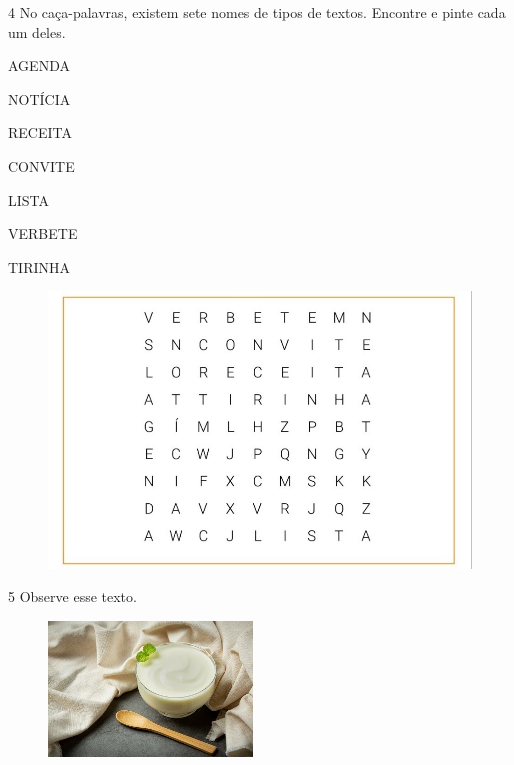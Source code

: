 \pagebreak
\num{4} No caça-palavras, existem sete nomes de tipos de textos. 
Encontre e pinte cada um deles.  

\begin{myquote}
\begin{multicols}{2}
AGENDA

NOTÍCIA

RECEITA

CONVITE

LISTA

VERBETE

TIRINHA
\end{multicols}
\end{myquote}


\begin{figure}[htpb!]
\includegraphics[width=\textwidth]{media/image104.jpeg}
\end{figure}


\pagebreak
\num{5} Observe esse texto.


\begin{figure}[htpb!]
\includegraphics[width=\textwidth]{media/image106.jpeg}
\end{figure}

